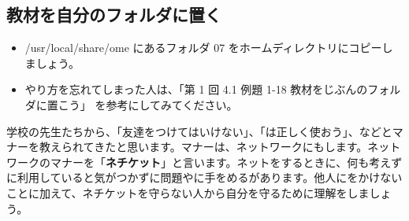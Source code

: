\documentclass[a4paper,12pt,dvipdfmx]{jarticle}
\begin{document}
\subsection*{教材を自分のフォルダに置く}
\begin{itemize}
	\item /usr/local/share/ome にあるフォルダ 07 をホームディレクトリにコピーしましょう。
	\item やり方を忘れてしまった人は、「第 1 回 4.1 例題 1-18 教材をじぶんのフォルダに置こう」 を参考にしてみてください。

\end{itemize}


学校の先生たちから、「友達をつけてはいけない」、「は正しく使おう」、などとマナーを教えられてきたと思います。マナーは、ネットワークにもします。ネットワークのマナーを「\textbf{ネチケット}」と言います。ネットをするときに、何も考えずに利用していると気がつかずに問題やに手をめるがあります。他人にをかけないことに加えて、ネチケットを守らない人から自分を守るために理解をしましょう。
\end{document}
